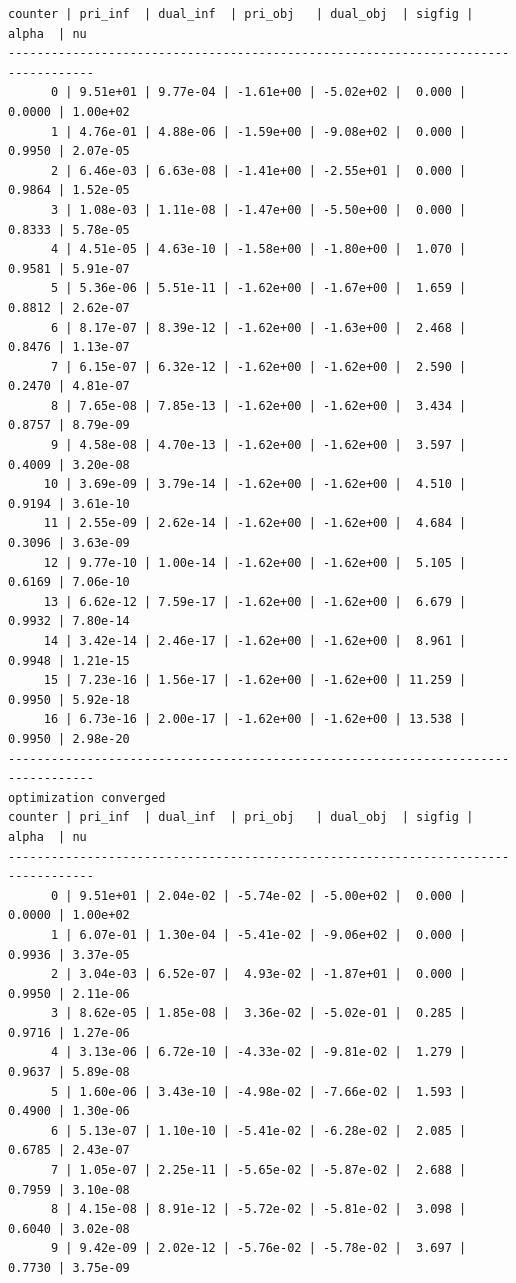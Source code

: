 \documentclass[
]{book}
\begin{document}
\begin{verbatim}
counter | pri_inf  | dual_inf  | pri_obj   | dual_obj  | sigfig | alpha  | nu 
----------------------------------------------------------------------------------
      0 | 9.51e+01 | 9.77e-04 | -1.61e+00 | -5.02e+02 |  0.000 | 0.0000 | 1.00e+02
      1 | 4.76e-01 | 4.88e-06 | -1.59e+00 | -9.08e+02 |  0.000 | 0.9950 | 2.07e-05
      2 | 6.46e-03 | 6.63e-08 | -1.41e+00 | -2.55e+01 |  0.000 | 0.9864 | 1.52e-05
      3 | 1.08e-03 | 1.11e-08 | -1.47e+00 | -5.50e+00 |  0.000 | 0.8333 | 5.78e-05
      4 | 4.51e-05 | 4.63e-10 | -1.58e+00 | -1.80e+00 |  1.070 | 0.9581 | 5.91e-07
      5 | 5.36e-06 | 5.51e-11 | -1.62e+00 | -1.67e+00 |  1.659 | 0.8812 | 2.62e-07
      6 | 8.17e-07 | 8.39e-12 | -1.62e+00 | -1.63e+00 |  2.468 | 0.8476 | 1.13e-07
      7 | 6.15e-07 | 6.32e-12 | -1.62e+00 | -1.62e+00 |  2.590 | 0.2470 | 4.81e-07
      8 | 7.65e-08 | 7.85e-13 | -1.62e+00 | -1.62e+00 |  3.434 | 0.8757 | 8.79e-09
      9 | 4.58e-08 | 4.70e-13 | -1.62e+00 | -1.62e+00 |  3.597 | 0.4009 | 3.20e-08
     10 | 3.69e-09 | 3.79e-14 | -1.62e+00 | -1.62e+00 |  4.510 | 0.9194 | 3.61e-10
     11 | 2.55e-09 | 2.62e-14 | -1.62e+00 | -1.62e+00 |  4.684 | 0.3096 | 3.63e-09
     12 | 9.77e-10 | 1.00e-14 | -1.62e+00 | -1.62e+00 |  5.105 | 0.6169 | 7.06e-10
     13 | 6.62e-12 | 7.59e-17 | -1.62e+00 | -1.62e+00 |  6.679 | 0.9932 | 7.80e-14
     14 | 3.42e-14 | 2.46e-17 | -1.62e+00 | -1.62e+00 |  8.961 | 0.9948 | 1.21e-15
     15 | 7.23e-16 | 1.56e-17 | -1.62e+00 | -1.62e+00 | 11.259 | 0.9950 | 5.92e-18
     16 | 6.73e-16 | 2.00e-17 | -1.62e+00 | -1.62e+00 | 13.538 | 0.9950 | 2.98e-20
----------------------------------------------------------------------------------
optimization converged
counter | pri_inf  | dual_inf  | pri_obj   | dual_obj  | sigfig | alpha  | nu 
----------------------------------------------------------------------------------
      0 | 9.51e+01 | 2.04e-02 | -5.74e-02 | -5.00e+02 |  0.000 | 0.0000 | 1.00e+02
      1 | 6.07e-01 | 1.30e-04 | -5.41e-02 | -9.06e+02 |  0.000 | 0.9936 | 3.37e-05
      2 | 3.04e-03 | 6.52e-07 |  4.93e-02 | -1.87e+01 |  0.000 | 0.9950 | 2.11e-06
      3 | 8.62e-05 | 1.85e-08 |  3.36e-02 | -5.02e-01 |  0.285 | 0.9716 | 1.27e-06
      4 | 3.13e-06 | 6.72e-10 | -4.33e-02 | -9.81e-02 |  1.279 | 0.9637 | 5.89e-08
      5 | 1.60e-06 | 3.43e-10 | -4.98e-02 | -7.66e-02 |  1.593 | 0.4900 | 1.30e-06
      6 | 5.13e-07 | 1.10e-10 | -5.41e-02 | -6.28e-02 |  2.085 | 0.6785 | 2.43e-07
      7 | 1.05e-07 | 2.25e-11 | -5.65e-02 | -5.87e-02 |  2.688 | 0.7959 | 3.10e-08
      8 | 4.15e-08 | 8.91e-12 | -5.72e-02 | -5.81e-02 |  3.098 | 0.6040 | 3.02e-08
      9 | 9.42e-09 | 2.02e-12 | -5.76e-02 | -5.78e-02 |  3.697 | 0.7730 | 3.75e-09

\end{verbatim}
\end{document}
